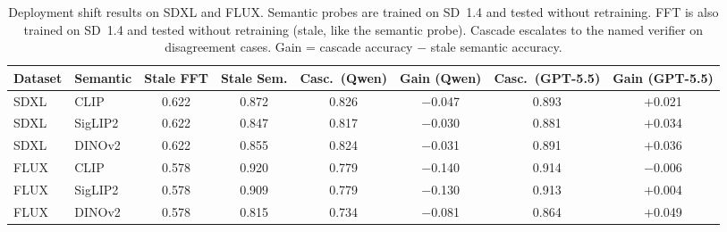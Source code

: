 \documentclass{ieeeaccess}
\begin{document}
\begin{table}[t]
\footnotesize
\centering
\caption{Deployment shift results on SDXL and FLUX. Semantic probes are trained on
SD~1.4 and tested without retraining. FFT is also trained on SD~1.4 and tested without
retraining (stale, like the semantic probe). Cascade escalates to the named verifier on
disagreement cases. Gain = cascade accuracy $-$ stale semantic accuracy.}
\label{tab:e8_results}
\begin{tabular}{llcccccc}
\toprule
Dataset & Semantic & Stale FFT & Stale Sem. & Casc.\ (Qwen) & Gain (Qwen) & Casc.\ (GPT-5.5) & Gain (GPT-5.5) \\
\midrule
SDXL & CLIP    & 0.622 & 0.872 & 0.826 & $-$0.047 & 0.893 & $+$0.021 \\
SDXL & SigLIP2 & 0.622 & 0.847 & 0.817 & $-$0.030 & 0.881 & $+$0.034 \\
SDXL & DINOv2  & 0.622 & 0.855 & 0.824 & $-$0.031 & 0.891 & $+$0.036 \\
\midrule
FLUX & CLIP    & 0.578 & 0.920 & 0.779 & $-$0.140 & 0.914 & $-$0.006 \\
FLUX & SigLIP2 & 0.578 & 0.909 & 0.779 & $-$0.130 & 0.913 & $+$0.004 \\
FLUX & DINOv2  & 0.578 & 0.815 & 0.734 & $-$0.081 & 0.864 & $+$0.049 \\
\bottomrule
\end{tabular}
\end{table}
\end{document}
